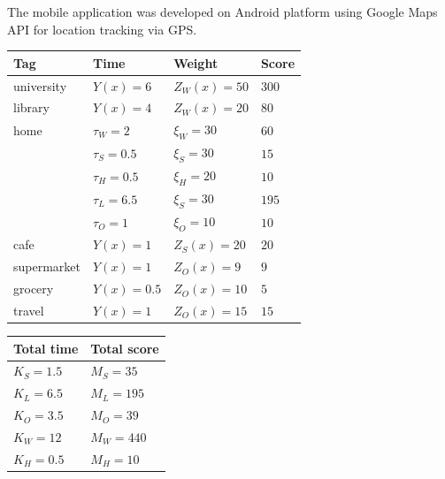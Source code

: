 \documentclass[conference]{IEEEtran}
\begin{document}
The mobile application was developed on Android platform using Google Maps API for location tracking via GPS.
\begin{table}
\small
{}
\begin{center}
\def\arraystretch{1.7}
\begin{tabular}{| l | l | l | l |}
\hline
\bf Tag & \bf Time & \bf Weight & \bf Score \\
\hline
university & $Y(x)=6$ & $Z_W(x) = 50$ & $300$ \\
\hline
library & $Y(x)=4$ & $Z_W(x) = 20$ & $80$ \\
\hline
home & $\tau_W=2$ & $\xi_W=30$ & $60$ \\
& $\tau_S=0.5$ & $\xi_S=30$ & $15$ \\
& $\tau_H=0.5$ & $\xi_H=20$ & $10$ \\
& $\tau_L=6.5$ & $\xi_S=30$ & $195$ \\
& $\tau_O=1$ & $\xi_O=10$ & $10$ \\
\hline
cafe & $Y(x)=1$ & $Z_S(x)=20$ & $20$ \\
\hline
supermarket & $Y(x)=1$ & $Z_O(x)=9$ & $9$ \\
\hline
grocery & $Y(x)=0.5$ & $Z_O(x)=10$ & $5$ \\
\hline
travel & $Y(x)=1$ & $Z_O(x)=15$ & $15$ \\
\hline
\end{tabular}
\end{center}
\end{table}
\begin{table}
\small
{}
\begin{center}
\def\arraystretch{1.7}
\begin{tabular}{| l | l |}
\hline
\bf Total time & \bf Total score \\
\hline
$K_S=1.5$ & $M_S=35$ \\
\hline
$K_L=6.5$ & $M_L=195$ \\
\hline
$K_O=3.5$ & $M_O=39$ \\
\hline
$K_W=12$ & $M_W=440$ \\
\hline
$K_H=0.5$ & $M_H=10$ \\
\hline
\end{tabular}
\end{center}
\end{table}
\end{document}
